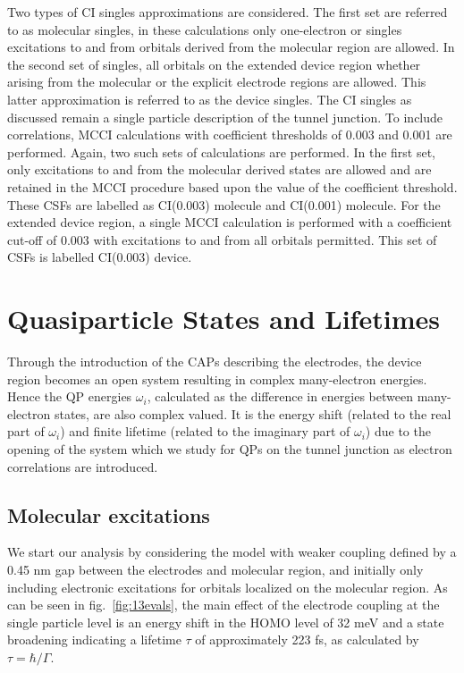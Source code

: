 Two types of CI singles approximations are considered. The first set are
referred to as molecular singles, in these calculations only one-electron
or singles excitations to and from orbitals derived from the molecular
region are allowed. In the second set of singles, all orbitals on the
extended device region whether arising from the molecular or the explicit
electrode regions are allowed. This latter approximation is referred to
as the device singles. The CI singles as discussed remain a single
particle description of the tunnel junction. To include correlations,
MCCI calculations with coefficient thresholds of 0.003 and 0.001 are
performed. Again, two such sets of calculations are performed. In the
first set, only excitations to and from the molecular derived states are
allowed and are retained in the MCCI procedure based upon the value of
the coefficient threshold. These CSFs are labelled as CI(0.003) molecule
and CI(0.001) molecule. For the extended device region, a single MCCI
calculation is performed with a coefficient cut-off of 0.003 with
excitations to and from all orbitals permitted. This set of CSFs is
labelled CI(0.003) device. 

\section{Quasiparticle States and Lifetimes}

Through the introduction of the \acp{CAP} describing the electrodes, the
device region becomes an open system resulting in complex many-electron
energies. Hence the \ac{QP} energies $\omega_i$, calculated  as the
difference in energies between many-electron states, are also complex
valued. It is the energy shift (related to the real part of $\omega_i$)
and finite lifetime (related to the imaginary part of $\omega_i$) due to
the opening of the system which we study for \acp{QP} on the
tunnel junction as electron correlations are introduced.

\subsection{Molecular excitations}
We start our analysis by considering the model with weaker coupling
defined by a 0.45 nm gap between the electrodes and molecular region,
and initially only including electronic excitations for orbitals localized
on the molecular region. As can be seen in fig.~\ref{fig:13evals}, the
main effect of the electrode coupling at the single particle level is an
energy shift in the HOMO level of 32 meV and a state broadening indicating
a lifetime $\tau$ of approximately 223 fs, as calculated by
$\tau = \hbar / \Gamma$.

